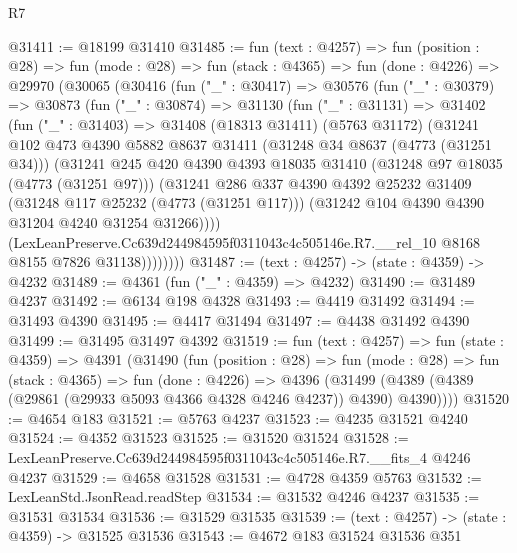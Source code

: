 \begin{lexlean}{R7}
\begin{coremodule}
@31411 := @18199 @31410
@31485 := fun (text : @4257) =>
  fun (position : @28) =>
  fun (mode : @28) =>
  fun (stack : @4365) =>
  fun (done : @4226) =>
  @29970
    (@30065
      (@30416
        (fun ("_" : @30417) =>
        @30576
          (fun ("_" : @30379) =>
          @30873
            (fun ("_" : @30874) =>
            @31130
              (fun ("_" : @31131) =>
              @31402
                (fun ("_" : @31403) =>
                @31408
                  (@18313 @31411)
                  (@5763 @31172)
                  (@31241
                    @102
                    @473
                    @4390
                    @5882
                    @8637
                    @31411
                    (@31248 @34 @8637 (@4773 (@31251 @34)))
                    (@31241
                      @245
                      @420
                      @4390
                      @4393
                      @18035
                      @31410
                      (@31248 @97 @18035 (@4773 (@31251 @97)))
                      (@31241
                        @286
                        @337
                        @4390
                        @4392
                        @25232
                        @31409
                        (@31248 @117 @25232 (@4773 (@31251 @117)))
                        (@31242 @104 @4390 @4390 @31204 @4240 @31254 @31266))))
                  (LexLeanPreserve.Cc639d244984595f0311043c4c505146e.R7.__rel_10
                    @8168
                    @8155
                    @7826
                    @31138))))))))
@31487 := (text : @4257) -> (state : @4359) -> @4232
@31489 := @4361 (fun ("_" : @4359) => @4232)
@31490 := @31489 @4237
@31492 := @6134 @198 @4328
@31493 := @4419 @31492
@31494 := @31493 @4390
@31495 := @4417 @31494
@31497 := @4438 @31492 @4390
@31499 := @31495 @31497 @4392
@31519 := fun (text : @4257) =>
  fun (state : @4359) =>
  @4391
    (@31490
      (fun (position : @28) =>
      fun (mode : @28) =>
      fun (stack : @4365) =>
      fun (done : @4226) =>
      @4396 (@31499 (@4389 (@4389 (@29861 (@29933 @5093 @4366 @4328 @4246 @4237)) @4390) @4390))))
@31520 := @4654 @183
@31521 := @5763 @4237
@31523 := @4235 @31521 @4240
@31524 := @4352 @31523
@31525 := @31520 @31524
@31528 := LexLeanPreserve.Cc639d244984595f0311043c4c505146e.R7.__fits_4 @4246 @4237
@31529 := @4658 @31528
@31531 := @4728 @4359 @5763
@31532 := LexLeanStd.JsonRead.readStep
@31534 := @31532 @4246 @4237
@31535 := @31531 @31534
@31536 := @31529 @31535
@31539 := (text : @4257) -> (state : @4359) -> @31525 @31536
@31543 := @4672 @183 @31524 @31536 @351

\end{coremodule}
\end{lexlean}
